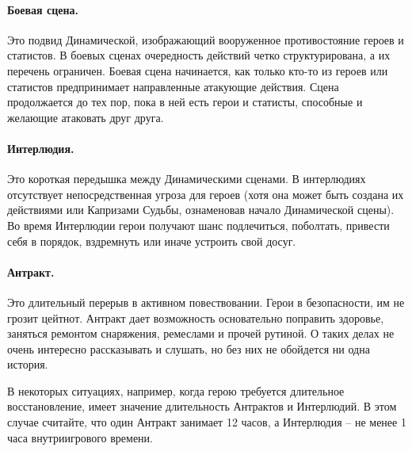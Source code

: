 \paragraph{Боевая сцена.} Это подвид Динамической, изображающий вооруженное противостояние героев и статистов. В боевых сценах очередность действий четко структурирована, а их перечень ограничен. Боевая сцена начинается, как только кто-то из героев или статистов предпринимает направленные атакующие действия. Сцена продолжается до тех пор, пока в ней есть герои и статисты, способные и желающие атаковать друг друга.
\paragraph{Интерлюдия.} Это короткая передышка между Динамическими сценами. В интерлюдиях отсутствует непосредственная угроза для героев (хотя она может быть создана их действиями или Капризами Судьбы, ознаменовав начало Динамической сцены). Во время Интерлюдии герои получают шанс подлечиться, поболтать, привести себя в порядок, вздремнуть или иначе устроить свой досуг. 
\paragraph{Антракт.} Это 
длительный перерыв в активном повествовании. Герои в безопасности, им не грозит цейтнот. Антракт дает возможность основательно поправить здоровье, заняться ремонтом снаряжения, ремеслами и прочей рутиной. О таких делах не очень интересно рассказывать и слушать, но без них не обойдется ни одна история.

\begin{tcolorbox}
В некоторых ситуациях, например, когда герою требуется длительное восстановление, имеет значение длительность Антрактов и Интерлюдий. В этом случае считайте, что один Антракт занимает 12 часов, а Интерлюдия – не менее 1 часа внутриигрового времени. 
\end{tcolorbox}

